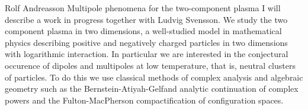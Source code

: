 \talk
{%
    Rolf Andreasson
}
{%
    Multipole phenomena for the two-component plasma
}
{%
    I will describe a work in progress together with Ludvig
    Svensson. We study the two component plasma in two dimensions, a
    well-studied model in mathematical physics describing positive
    and negatively charged particles in two dimensions with
    logarithmic interaction. In particular we are interested in the
    conjectural occurence of dipoles and multipoles at low
    temperature, that is, neutral clusters of particles. To do this
    we use classical methods of complex analysis and algebraic
    geometry such as the Bernstein-Atiyah-Gelfand analytic
    continuation of complex powers and the Fulton-MacPherson
    compactification of configuration spaces.
}
